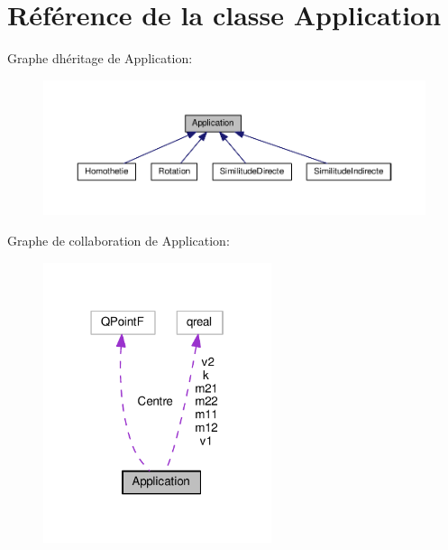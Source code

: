 \hypertarget{class_application}{}\section{Référence de la classe Application}
\label{class_application}


Graphe d\textquotesingle{}héritage de Application\+:\nopagebreak
\begin{figure}[H]
\begin{center}
\leavevmode
\includegraphics[width=350pt]{class_application__inherit__graph}
\end{center}
\end{figure}


Graphe de collaboration de Application\+:\nopagebreak
\begin{figure}[H]
\begin{center}
\leavevmode
\includegraphics[width=190pt]{class_application__coll__graph}
\end{center}
\end{figure}
